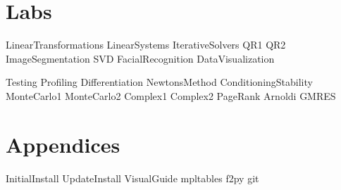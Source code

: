 \documentclass[nociteref]{SIAM-GH-book}
\begin{document}
\part{Labs} %
{LinearTransformations}
{LinearSystems}
{IterativeSolvers}
{QR1}
{QR2}
{ImageSegmentation}
{SVD}
{FacialRecognition}
{DataVisualization}

{Testing}
{Profiling}
{Differentiation}
{NewtonsMethod} %
{ConditioningStability}
{MonteCarlo1}
{MonteCarlo2}
{Complex1}
{Complex2}
{PageRank}
{Arnoldi}
{GMRES}


\part{Appendices} %
\begin{appendices}
{InitialInstall}
{UpdateInstall}
{VisualGuide}
{mpltables}
{f2py}
{git}
\end{appendices}
\end{document}
